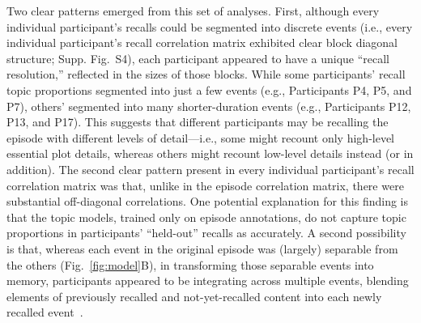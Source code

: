 \documentclass[10pt]{article}
\newcommand{\corrmats}{S4}
\begin{document}
Two clear patterns emerged from this set of analyses.  First, although every individual participant's recalls could be segmented into discrete events (i.e., every individual participant's recall correlation matrix exhibited clear block diagonal structure; Supp. Fig.~\corrmats), each participant appeared to have a unique ``recall resolution,'' reflected in the sizes of those blocks.  While some participants' recall topic proportions segmented into just a few events (e.g., Participants P4, P5, and P7), others' segmented into many shorter-duration events (e.g., Participants P12, P13, and P17).  This suggests that different participants may be recalling the episode with different levels of detail---i.e., some might recount only high-level essential plot details, whereas others might recount low-level details instead (or in addition).  The second clear pattern present in every individual participant's recall correlation matrix was that, unlike in the episode correlation matrix, there were substantial off-diagonal correlations.  One potential explanation for this finding is that the topic models, trained only on episode annotations, do not capture topic proportions in participants' ``held-out'' recalls as accurately.  A second possibility is that, whereas each event in the original episode was (largely) separable from the others (Fig.~\ref{fig:model}B), in transforming those separable events into memory, participants appeared to be integrating across multiple events, blending elements of previously recalled and not-yet-recalled content into each newly recalled event~\citep[Fig.~\ref{fig:model}E, Supp. Fig.~\corrmats; also see][]{MannEtal11, HowaEtal12, Mann19}.
\end{document}
